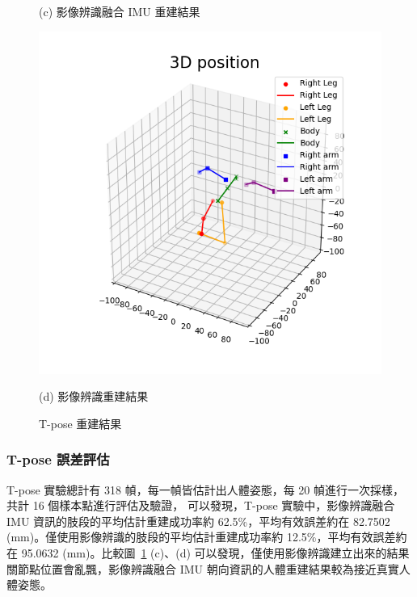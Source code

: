 \begin{figure}[!ht]
\begin{minipage}{.5\textwidth}
      \caption*{(c) 影像辨識融合 IMU 重建結果}
   \end{minipage}%
   \begin{minipage}{.5\textwidth}
      \centering
      \includegraphics[width=.95\linewidth]{figure/ch4_fig_tpose_result_no2.png}
      \caption*{(d) 影像辨識重建結果}
   \end{minipage}
   \caption[T-pose 重建結果]{T-pose 重建結果}
   \label{ch4_fig_Tpose}
\end{figure}

\subsubsection*{T-pose 誤差評估}
T-pose 實驗總計有 318 幀，每一幀皆估計出人體姿態，每 20 幀進行一次採樣，共計 16 個樣本點進行評估及驗證，
可以發現，T-pose 實驗中，影像辨識融合 IMU 資訊的肢段的平均估計重建成功率約 62.5\%，平均有效誤差約在 82.7502 (mm)。僅使用影像辨識的肢段的平均估計重建成功率約 12.5\%，平均有效誤差約在 95.0632 (mm)。比較圖~\ref{ch4_fig_Tpose} (c)、(d) 可以發現，僅使用影像辨識建立出來的結果關節點位置會亂飄，影像辨識融合 IMU 朝向資訊的人體重建結果較為接近真實人體姿態。

